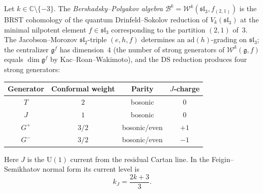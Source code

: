 \begin{definition}
\label{def:bp-algebra}
Let $k \in \mathbb{C} \setminus \{-3\}$. The
\emph{Bershadsky--Polyakov algebra}
$\mathcal{B}^k = \mathcal{W}^k(\mathfrak{sl}_3, f_{(2,1)})$ is the
BRST cohomology of the quantum Drinfeld--Sokolov reduction of
$V_k(\mathfrak{sl}_3)$ at the minimal nilpotent element
$f \in \mathfrak{sl}_3$ corresponding to the partition $(2,1)$
of~$3$. The Jacobson--Morozov $\mathfrak{sl}_2$-triple $(e,h,f)$
determines an $\mathrm{ad}(h)$-grading on $\mathfrak{sl}_3$; the
centralizer $\mathfrak{g}^f$ has dimension~$4$ (the number of strong
generators of $\mathcal{W}^k(\mathfrak{g}, f)$ equals $\dim \mathfrak{g}^f$
by Kac--Roan--Wakimoto), and the DS reduction produces four strong generators:
\begin{center}
\renewcommand{\arraystretch}{1.3}
\begin{tabular}{cccc}
\toprule
Generator & Conformal weight & Parity & $J$-charge \\
\midrule
$T$ & $2$ & bosonic & $0$ \\
$J$ & $1$ & bosonic & $0$ \\
$G^+$ & $3/2$ & bosonic/even & $+1$ \\
$G^-$ & $3/2$ & bosonic/even & $-1$ \\
\bottomrule
\end{tabular}
\end{center}
Here $J$ is the $\mathrm{U}(1)$ current from the residual Cartan line.
In the Feigin--Semikhatov normal form
\cite[(A.3)]{FeiginSemikhatov} its current level is
\[
k_J=\frac{2k+3}{3}.
\]
\end{definition}

